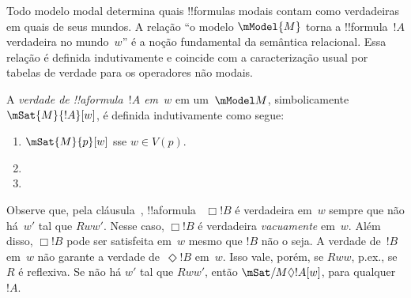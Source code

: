 \documentclass[../../../include/open-logic-section]{subfiles}
\begin{document}


Todo modelo modal determina quais !!{formula}s modais contam como
verdadeiras em quais de seus mundos. A relação ``o modelo $\mModel{M}$
torna a !!{formula}~$!A$ verdadeira no mundo~$w$'' é a noção fundamental
da semântica relacional. Essa relação é definida indutivamente e coincide
com a caracterização usual por tabelas de verdade para os operadores não
modais.

\begin{defn}
  A \emph{verdade de !!a{formula}~$!A$ em~$w$} em um~$\mModel M$,
  simbolicamente $\mSat{M}{!A}[w]$, é definida indutivamente como segue:
  \begin{enumerate}
  \item $\mSat{M}{p}[w]$ sse $w \in V(p)$.
  \item{}
  \item{}
  \end{enumerate}
\end{defn}

Observe que, pela cláusula~, !!a{formula}
~$\Box !B$ é verdadeira em~$w$ sempre que não há~$w'$ tal que $Rww'$.
Nesse caso, $\Box !B$ é verdadeira \emph{vacuamente} em~$w$. Além disso,
$\Box !B$ pode ser satisfeita em~$w$ mesmo que $!B$ não o seja. A verdade
de~$!B$ em~$w$ não garante a verdade de~$\Diamond !B$ em~$w$. Isso vale,
porém, se $Rww$, p.ex., se $R$ é reflexiva. Se não há $w'$ tal que
$Rww'$, então $\mSat/{M}{\Diamond !A}[w]$, para qualquer~$!A$.
\end{document}
